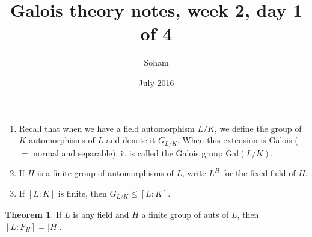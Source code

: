 \documentclass{article}
\title{Galois theory notes, week 2, day 1 of 4}
\author{Soham}
\date{July 2016}
\theoremstyle{definition}
\newtheorem*{thm}{Theorem}
\begin{document}
\maketitle
\begin{enumerate}
\item Recall that when we have a field automorphism $L/K$, we define the group of
$K$-automorphisms of $L$ and denote it $G_{L/K}$. When this extension is Galois
($=$ normal and separable), it is called the Galois group $\text{Gal}(L/K)$.

\item If $H$ is a finite group of automorphisms of $L$, write $L^H$ for the fixed
field of $H$.

\item If $[L:K]$ is finite, then $G_{L/K} \leq [L:K]$.
\end{enumerate}

\begin{thm}
If $L$ is any field and $H$ a finite group of auts of $L$, then $[L:F_H] = |H|$.
\end{thm}
\end{document}
